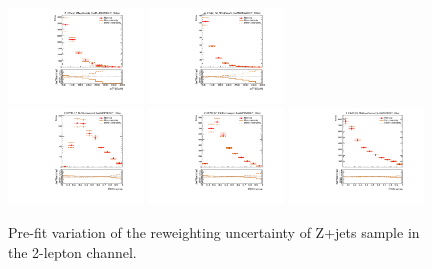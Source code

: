 \begin{figure}[htbp]
\begin{center}
 \includegraphics[width=0.32\textwidth,keepaspectratio]{figures/syst/Z_0ptag1pfat0pjet_0ptv_CRVjet_MTagMerJets_SysMJJREWEIGHT_100per.pdf}
 \includegraphics[width=0.32\textwidth,keepaspectratio]{figures/syst/Z_0ptag2pjet_0ptv_CRVjet_Fid_MTagResJets_SysMJJREWEIGHT_100per.pdf}
 \\
 \includegraphics[width=0.32\textwidth,keepaspectratio]{figures/syst/Z_0ptag1pfat0pjet_0ptv_SRVBS_HP_RNNScoreMerged_SysMJJREWEIGHT_100per.pdf}
 \includegraphics[width=0.32\textwidth,keepaspectratio]{figures/syst/Z_0ptag1pfat0pjet_0ptv_SRVBS_LP_RNNScoreMerged_SysMJJREWEIGHT_100per.pdf}
 \includegraphics[width=0.32\textwidth,keepaspectratio]{figures/syst/Z_0ptag2pjet_0ptv_SRVBS_Fid_RNNScoreResolved_SysMJJREWEIGHT_100per.pdf}
 \caption[f]{
Pre-fit variation of the reweighting uncertainty of Z+jets sample in the 2-lepton channel.
}
\label{fig:mjjreweighting}
\end{center}
\end{figure}

